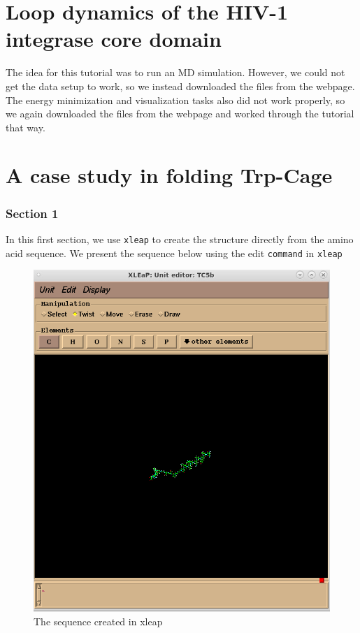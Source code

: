 \documentclass[11pt]{article}
\makeatletter
\def\maxwidth{\ifdim\Gin@nat@width>\linewidth\linewidth
    \else\Gin@nat@width\fi}
\let\Oldincludegraphics\includegraphics
\renewcommand{\includegraphics}[1]{\Oldincludegraphics[width=.8\maxwidth]{#1}}
\makeatother
\begin{document}
    \section{Loop dynamics of the HIV-1 integrase core
domain}\label{loop-dynamics-of-the-hiv-1-integrase-core-domain}

The idea for this tutorial was to run an MD simulation. However, we
could not get the data setup to work, so we instead downloaded the files
from the webpage. The energy minimization and visualization tasks also
did not work properly, so we again downloaded the files from the webpage
and worked through the tutorial that way.

    \section{A case study in folding
Trp-Cage}\label{a-case-study-in-folding-trp-cage}

\subsubsection{Section 1}\label{section-1}

In this first section, we use \texttt{xleap} to create the structure
directly from the amino acid sequence. We present the sequence below
using the edit \texttt{command} in \texttt{xleap}

\begin{figure}
\centering
\includegraphics{Screenshot_xleap.png}
\caption{The sequence created in xleap}
\end{figure}
\end{document}
